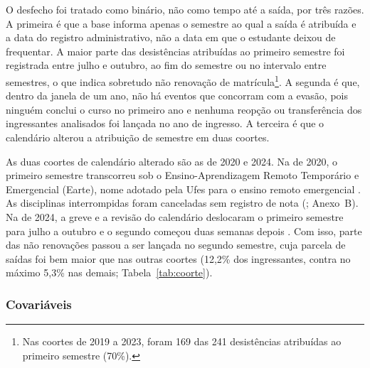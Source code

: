 \documentclass[12pt,a4paper]{article}
\begin{document}
O desfecho foi tratado como binário, não como tempo até a saída, por três razões. A primeira é que a base informa apenas o semestre ao qual a saída é atribuída e a data do registro administrativo, não a data em que o estudante deixou de frequentar. A maior parte das desistências atribuídas ao primeiro semestre foi registrada entre julho e outubro, ao fim do semestre ou no intervalo entre semestres, o que indica sobretudo não renovação de matrícula\footnote{Nas coortes de 2019 a 2023, foram 169 das 241 desistências atribuídas ao primeiro semestre (70\%).}. A segunda é que, dentro da janela de um ano, não há eventos que concorram com a evasão, pois ninguém conclui o curso no primeiro ano e nenhuma reopção ou transferência dos ingressantes analisados foi lançada no ano de ingresso. A terceira é que o calendário alterou a atribuição de semestre em duas coortes.

As duas coortes de calendário alterado são as de 2020 e 2024. Na de 2020, o primeiro semestre transcorreu sob o Ensino-Aprendizagem Remoto Temporário e Emergencial (Earte), nome adotado pela Ufes para o ensino remoto emergencial \citep{ufes2020resolucao30}. As disciplinas interrompidas foram canceladas sem registro de nota (\citealp{ufes2020oficio16}; Anexo~B). Na de 2024, a greve e a revisão do calendário deslocaram o primeiro semestre para julho a outubro e o segundo começou duas semanas depois \citep{ufes2024resolucao83}. Com isso, parte das não renovações passou a ser lançada no segundo semestre, cuja parcela de saídas foi bem maior que nas outras coortes (12,2\% dos ingressantes, contra no máximo 5,3\% nas demais; Tabela~\ref{tab:coorte}).

\subsubsection{Covariáveis}
\label{sec:covariaveis}
\end{document}
